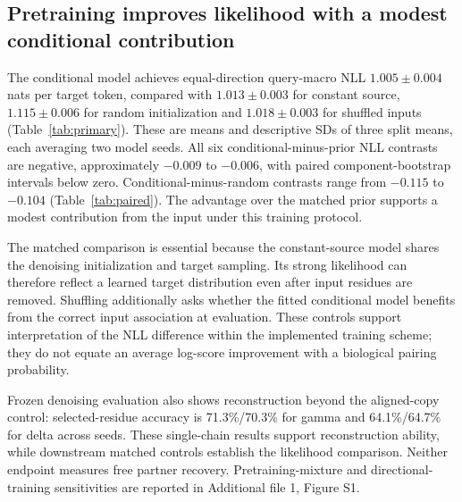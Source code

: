 \documentclass[a4paper,11pt]{article}
\begin{document}
\subsection{Pretraining improves likelihood with a modest conditional contribution}
The conditional model achieves equal-direction query-macro NLL
$1.005\pm0.004$ nats per target token, compared with $1.013\pm0.003$ for
constant source, $1.115\pm0.006$ for random initialization and
$1.018\pm0.003$ for shuffled inputs (Table~\ref{tab:primary}).
These are means and descriptive SDs of three split means, each averaging two
model seeds. All six conditional-minus-prior NLL contrasts are negative,
approximately $-0.009$ to $-0.006$, with paired component-bootstrap intervals
below zero. Conditional-minus-random contrasts range from $-0.115$ to
$-0.104$ (Table~\ref{tab:paired}). The advantage over the matched prior
supports a modest contribution from the input under this training protocol.

The matched comparison is essential because the constant-source model shares
the denoising initialization and target sampling. Its strong likelihood can
therefore reflect a learned target distribution even after input residues are
removed. Shuffling additionally asks whether the fitted conditional model
benefits from the correct input association at evaluation. These controls
support interpretation of the NLL difference within the implemented training
scheme; they do not equate an average log-score improvement with a biological
pairing probability.

Frozen denoising evaluation also shows reconstruction beyond the aligned-copy
control: selected-residue accuracy is 71.3\%/70.3\% for gamma and
64.1\%/64.7\% for delta across seeds. These single-chain results support
reconstruction ability, while downstream matched controls establish the
likelihood comparison. Neither endpoint measures free partner recovery.
Pretraining-mixture and directional-training sensitivities are reported in
Additional file 1, Figure S1.
\end{document}

